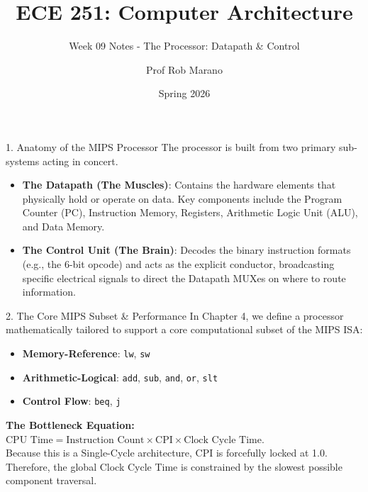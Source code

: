 \documentclass[aspectratio=169]{beamer}
\title{ECE 251: Computer Architecture}
\subtitle{Week 09 Notes - The Processor: Datapath \& Control}
\author{Prof Rob Marano}
\date{Spring 2026}
\begin{document}
\frame{\titlepage}

\begin{frame}{1. Anatomy of the MIPS Processor}
The processor is built from two primary sub-systems acting in concert.
\vspace{0.2cm}
\begin{itemize}
    \item \textbf{The Datapath (The Muscles)}: Contains the hardware elements that physically hold or operate on data. Key components include the Program Counter (PC), Instruction Memory, Registers, Arithmetic Logic Unit (ALU), and Data Memory.
    \item \textbf{The Control Unit (The Brain)}: Decodes the binary instruction formats (e.g., the 6-bit opcode) and acts as the explicit conductor, broadcasting specific electrical signals to direct the Datapath MUXes on where to route information.
\end{itemize}
\end{frame}

\begin{frame}{2. The Core MIPS Subset \& Performance}
In Chapter 4, we define a processor mathematically tailored to support a core computational subset of the MIPS ISA:
\vspace{0.2cm}
\begin{itemize}
    \item \textbf{Memory-Reference}: \texttt{lw}, \texttt{sw}
    \item \textbf{Arithmetic-Logical}: \texttt{add}, \texttt{sub}, \texttt{and}, \texttt{or}, \texttt{slt}
    \item \textbf{Control Flow}: \texttt{beq}, \texttt{j}
\end{itemize}
\vspace{0.2cm}
\textbf{The Bottleneck Equation:} \\
$\text{CPU Time} = \text{Instruction Count} \times \text{CPI} \times \text{Clock Cycle Time}$. \\
Because this is a Single-Cycle architecture, CPI is forcefully locked at 1.0. Therefore, the global Clock Cycle Time is constrained by the slowest possible component traversal.
\end{frame}
\end{document}
